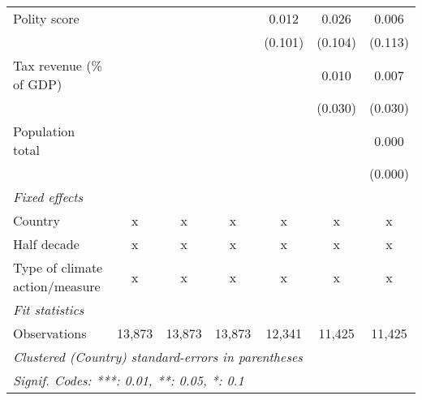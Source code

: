 \begin{tabular}{lcccccc}
   Polity score                                                           &             &         &             & 0.012        & 0.026         & 0.006\\   
                                                                          &             &         &             & (0.101)      & (0.104)       & (0.113)\\   
   Tax revenue (\% of GDP)                                                &             &         &             &              & 0.010         & 0.007\\   
                                                                          &             &         &             &              & (0.030)       & (0.030)\\   
   Population total                                                       &             &         &             &              &               & 0.000\\   
                                                                          &             &         &             &              &               & (0.000)\\   
   \emph{Fixed effects}\\
   Country                                                                & x           & x       & x           & x            & x             & x\\  
   Half decade                                                            & x           & x       & x           & x            & x             & x\\  
   Type of climate action/measure                                         & x           & x       & x           & x            & x             & x\\  
   \midrule \emph{Fit statistics}\\
   Observations                                                           & 13,873      & 13,873  & 13,873      & 12,341       & 11,425        & 11,425\\  
   \midrule
   \multicolumn{7}{l}{\emph{Clustered (Country) standard-errors in parentheses}}\\
   \multicolumn{7}{l}{\emph{Signif. Codes: ***: 0.01, **: 0.05, *: 0.1}}\\
\end{tabular}
\par\endgroup


